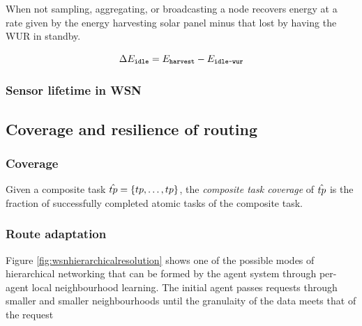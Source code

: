 When not sampling, aggregating, or broadcasting a node recovers energy at a rate given by the energy harvesting solar panel minus that lost by having the WUR in standby.

\begin{equation}
	\setEnergyDeltaIdle{}{}
	= 
	\setEnergyHarvest{}{}
	-
	\setEnergyWUR{}{}
\end{equation}

\subsubsection{Sensor lifetime in WSN}

\subsection{Coverage and resilience of routing}

\subsubsection{Coverage}

\begin{definition}
	Given a composite task $\varCompositeTask{}{} = \lbrace \varAtomicTask{1}{}, \dots, \varAtomicTask{2}{} \rbrace$, the \textit{composite task coverage} of $\varCompositeTask{}{}$ is the fraction of successfully completed atomic tasks of the composite task.
\end{definition}


\subsubsection{Route adaptation}
Figure \ref{fig:wsnhierarchicalresolution} shows one of the possible modes of hierarchical networking that can be formed by the agent system through per-agent local neighbourhood learning. The initial agent passes requests through smaller and smaller neighbourhoods until the granulaity of the data meets that of the request

